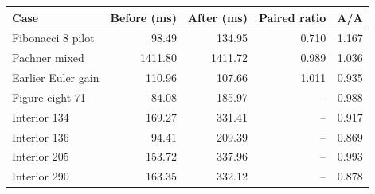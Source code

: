 \begin{center}
\small
\begin{tabular}{lrrrr}
\toprule
Case & Before (ms) & After (ms) & Paired ratio & A/A \\
\midrule
Fibonacci 8 pilot & 98.49 & 134.95 & 0.710 & 1.167 \\
Pachner mixed & 1411.80 & 1411.72 & 0.989 & 1.036 \\
Earlier Euler gain & 110.96 & 107.66 & 1.011 & 0.935 \\
Figure-eight 71 & 84.08 & 185.97 & -- & 0.988 \\
Interior 134 & 169.27 & 331.41 & -- & 0.917 \\
Interior 136 & 94.41 & 209.39 & -- & 0.869 \\
Interior 205 & 153.72 & 337.96 & -- & 0.993 \\
Interior 290 & 163.35 & 332.12 & -- & 0.878 \\
\bottomrule
\end{tabular}
\end{center}
